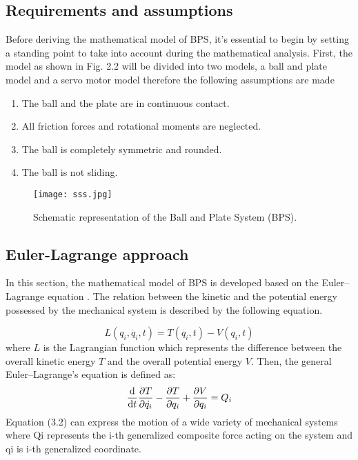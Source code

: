 \subsection{Requirements and assumptions}
Before deriving the mathematical model of BPS, it's essential to begin by setting a standing point to take into account during the mathematical analysis. First, the model as shown in Fig. 2.2 will be divided into two models, a ball and plate model and a servo motor model therefore the following assumptions are made
\begin{enumerate}
    \item The ball and the plate are in continuous contact.
    \item All friction forces and rotational moments are neglected.
    \item The ball is completely symmetric and rounded.
    \item The ball is not sliding.
\end{enumerate}
\begin{figure}[h]
\centering
\texttt{[image: sss.jpg]}
\caption{Schematic representation of the Ball and Plate System (BPS).}
\end{figure}
\subsection{Euler-Lagrange approach}
In this section, the mathematical model of BPS is developed based on the Euler–Lagrange equation \cite{nokhbeh2011modelling}.
The relation between the kinetic and the potential energy
possessed by the mechanical system is described by the following
equation.

\begin{equation}
L(q_i, \dot{q_i}, t) = T( \dot{q_i}, t) - V( q_i, t) 
\end{equation}
where $L $ is the Lagrangian function which represents the
difference between the overall kinetic energy $T$ and the overall potential
energy $V$. Then, the general Euler–Lagrange’s equation is
defined as:
\begin{equation}
\dv{t} \pdv{T}{\dot{q_i}} - \pdv{T}{q_i} + \pdv{V}{q_i} = Q_i    
\end{equation}
Equation (3.2) can express the motion of a wide variety of
mechanical systems where Qi represents the i-th generalized composite force acting on the system and qi is i-th generalized coordinate.\\

